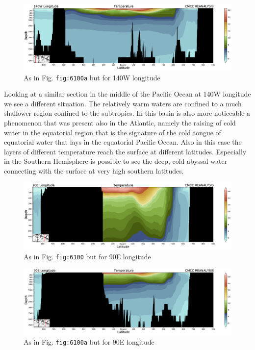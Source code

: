 \begin{figure}
	\centering
	\includegraphics[width = .7 \textwidth]{figs/GD/Sect140W5000.png}
	\caption{As in Fig. \texttt{fig:6100a} but for 140W longitude}
\end{figure}

Looking at a similar section in the middle of the Pacific Ocean at 140W
longitude we see a different situation. The relatively warm waters are
confined to a much shallower region confined to the subtropics. In this
basin is also more noticeable a phenomenon that was present also in the
Atlantic, namely the raising of cold water in the equatorial region that
is the signature of the cold tongue of equatorial water that lays in the
equatorial Pacific Ocean. Also in this case the layers of different
temperature reach the surface at different latitudes. Especially in the
Southern Hemisphere is possible to see the deep, cold abyssal water
connecting with the surface at very high southern latitudes.

\begin{figure}
	\centering
	\includegraphics[width = .7 \textwidth]{figs/GD/Sect90E1000.png}
	\caption{As in Fig. \texttt{fig:6100} but for 90E longitude}
\end{figure}

\begin{figure}
	\centering
	\includegraphics[width = .7 \textwidth]{figs/GD/Sect90E5000.png}
	\caption{As in Fig. \texttt{fig:6100a} but for 90E longitude}
\end{figure}

